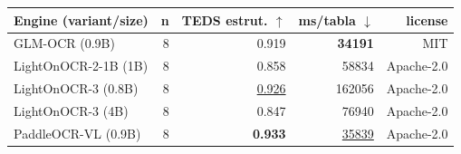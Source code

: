 \documentclass[border=2pt]{standalone}
\begin{document}
\begin{tabular}{lrrrr}
\toprule
Engine (variant/size) & n & TEDS estrut. $\uparrow$ & ms/tabla $\downarrow$ & license \\
\midrule
GLM-OCR (0.9B) & 8 & 0.919 & \textbf{34191} & MIT \\
LightOnOCR-2-1B (1B) & 8 & 0.858 & 58834 & Apache-2.0 \\
LightOnOCR-3 (0.8B) & 8 & \underline{0.926} & 162056 & Apache-2.0 \\
LightOnOCR-3 (4B) & 8 & 0.847 & 76940 & Apache-2.0 \\
PaddleOCR-VL (0.9B) & 8 & \textbf{0.933} & \underline{35839} & Apache-2.0 \\
\bottomrule
\end{tabular}
\par{}
\end{document}
